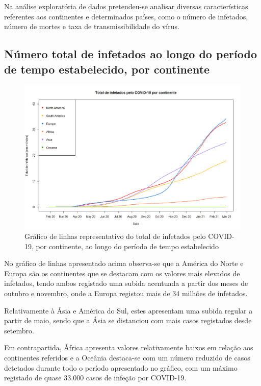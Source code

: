 \documentclass[conference]{IEEEtran}
\begin{document}
Na análise exploratória de dados pretendeu-se analisar diversas características referentes aos continentes e determinados países, como o número de infetados, número de mortes e taxa de transmissibilidade do vírus.

\subsection{Número total de infetados ao longo do período de tempo estabelecido, por continente}

\begin{figure}[htbp]
\centerline{\includegraphics[width=0.95\columnwidth]{images/01.a.png}}
\caption{Gráfico de linhas representativo do total de infetados pelo COVID-19, por continente, ao longo do período de tempo estabelecido}
\label{fig}
\end{figure}

No gráfico de linhas apresentado acima observa-se que a América do Norte e Europa são os continentes que se destacam com os valores mais elevados de infetados, tendo ambos registado uma subida acentuada a partir dos meses de outubro e novembro, onde a Europa registou mais de 34 milhões de infetados. 

Relativamente à Ásia e América do Sul, estes apresentam uma subida regular a partir de maio, sendo que a Ásia se distanciou com mais casos registados desde setembro.

Em contrapartida, África apresenta valores relativamente baixos em relação aos continentes referidos e a Oceânia destaca-se com um número reduzido de casos detetados durante todo o período apresentado no gráfico, com um máximo registado de quase 33.000 casos de infeção por COVID-19.
\end{document}
